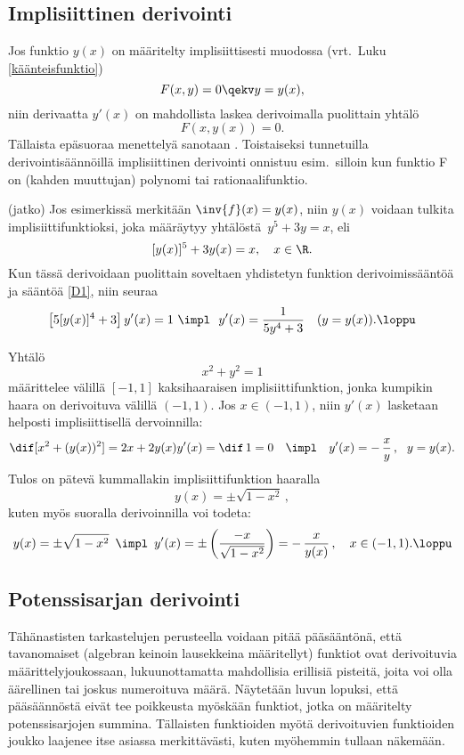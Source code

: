 \subsection*{Implisiittinen derivointi}
 

Jos funktio $y(x)$ on määritelty implisiittisesti muodossa (vrt.\ Luku \ref{käänteisfunktio})
\[ 
F(x,y) = 0 \qekv y = y(x), 
\]
niin derivaatta $y'(x)$ on mahdollista laskea derivoimalla puolittain yhtälö
\[ 
F(x,y(x)) = 0.
\]
Tällaista epäsuoraa menettelyä sanotaan . Toistaiseksi
tunnetuilla derivointisäännöillä implisiittinen derivointi onnistuu esim.\ silloin kun
funktio F on (kahden muuttujan) polynomi tai rationaalifunktio.
\jatko \begin{Exa} (jatko) Jos esimerkissä merkitään $\inv{f}(x)=y(x)$, niin $y(x)$ voidaan
tulkita implisiittifunktioksi, joka määräytyy yhtälöstä $\,y^5+3y=x$, eli
\[
[y(x)]^5+3y(x)=x, \quad x\in\R.
\]
Kun tässä derivoidaan puolittain soveltaen yhdistetyn funktion derivoimissääntöä ja sääntöä
\eqref{D1}, niin seuraa
\[ 
\bigl[5[y(x)]^4+3\bigr]\,y'(x)=1\ \impl\ \ y'(x)=\frac{1}{5y^4+3} \quad (y=y(x)). \loppu
\]
\end{Exa}
\begin{Exa} Yhtälö 
\[ 
x^2 + y^2 = 1 
\]
määrittelee välillä $[-1,1]$ kaksihaaraisen implisiittifunktion, jonka kumpikin haara on
derivoituva välillä $(-1,1)$. Jos $x\in(-1,1)$, niin $y'(x)$ lasketaan helposti
implisiittisellä dervoinnilla:
\begin{align*}
 \dif[x^2 + (y(x))^2] &= 2x + 2y(x)y'(x) = \dif\,1 = 0
                      &\impl \quad y'(x) = -\,\dfrac{x}{y}\,,\ \ y=y(x).
\end{align*}
Tulos on pätevä kummallakin implisiittifunktion haaralla
\[ 
y(x) = \pm \sqrt{1-x^2}\,, 
\]
kuten myös suoralla derivoinnilla voi todeta:
\[
y(x) = \pm\sqrt{1-x^2}\,\ \impl\,\ y'(x) = \pm\left(\frac{-x}{\sqrt{1-x^2}}\right) 
                                         = -\,\frac{x}{y(x)}\,, \quad x \in (-1,1). \loppu
\]
\end{Exa}

\subsection*{Potenssisarjan derivointi}

Tähänastisten tarkastelujen perusteella voidaan pitää pääsääntönä, että tavanomaiset
(algebran keinoin lausekkeina määritellyt) funktiot ovat derivoituvia määrittelyjoukossaan,
lukuunottamatta mahdollisia erillisiä pisteitä, joita voi olla äärellinen tai joskus
numeroituva määrä. Näytetään luvun lopuksi, että pääsäännöstä eivät tee poikkeusta myöskään
funktiot, jotka on määritelty potenssisarjojen summina. Tällaisten funktioiden myötä
derivoituvien funktioiden joukko laajenee itse asiassa merkittävästi, kuten myöhemmin tullaan
näkemään.

